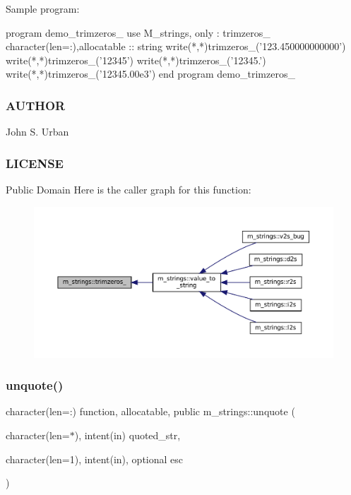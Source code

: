 Sample program\+: \begin{DoxyVerb}program demo_trimzeros_
use M_strings, only : trimzeros_
character(len=:),allocatable :: string
   write(*,*)trimzeros_('123.450000000000')
   write(*,*)trimzeros_('12345')
   write(*,*)trimzeros_('12345.')
   write(*,*)trimzeros_('12345.00e3')
end program demo_trimzeros_
\end{DoxyVerb}


\subsubsection*{A\+U\+T\+H\+OR}

John S. Urban \subsubsection*{L\+I\+C\+E\+N\+SE}

Public Domain Here is the caller graph for this function\+:\nopagebreak
\begin{figure}[H]
\begin{center}
\leavevmode
\includegraphics[width=350pt]{namespacem__strings_aedbeefa963a63edc16b10e2a833eb609_icgraph}
\end{center}
\end{figure}
\mbox{\label{namespacem__strings_acb88c65d5df2d5b3e55df2d2dab57390}} 
\subsubsection{\texorpdfstring{unquote()}{unquote()}}
{\footnotesize\ttfamily character(len=\+:) function, allocatable, public m\+\_\+strings\+::unquote (\begin{DoxyParamCaption}\item[{character(len=$\ast$), intent(in)}]{quoted\+\_\+str,  }\item[{character(len=1), intent(in), optional}]{esc }\end{DoxyParamCaption})}



